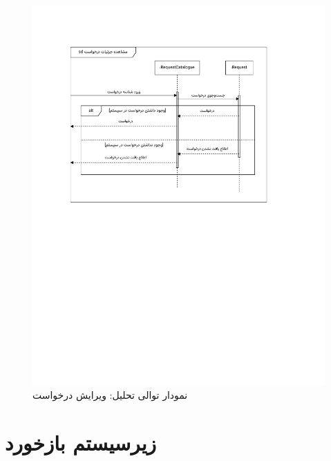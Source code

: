 \begin{figure}[ht!]
	\centering
	\includegraphics[scale=0.8, page=10]{figs/OOD-Sequence-2.pdf}
	\caption{نمودار توالی تحلیل: ویرایش درخواست}
\end{figure}
\FloatBarrier
\newpage


\section{زیرسیستم بازخورد}



